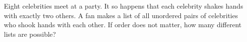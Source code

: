 Eight celebrities meet at a party. It so happens that each celebrity shakes hands with exactly two others. A fan makes a list of all unordered pairs of celebrities who shook hands with each other. If order does not matter, how many different lists are possible?